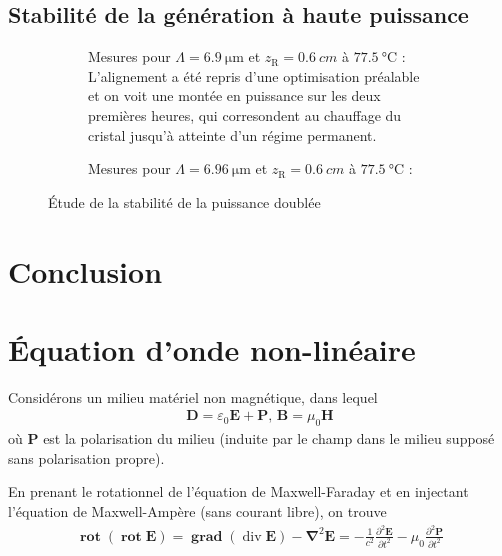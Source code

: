 \documentclass[11pt,a4paper] { article}
\newcommand{\zr}{z_\mathsc{R}}
\DeclareMathOperator{\divg}{div}
\DeclareMathOperator{\rot}{\mathbf{rot}}
\DeclareMathOperator{\grad}{\mathbf{grad}}
\newcommand{\mathsc}[1]{\mathrm{\scriptscriptstyle {#1}}}
\renewcommand{\v}[1]{\boldsymbol{\mathbf{#1}}}
\begin{document}
\subsection{Stabilité de la génération à haute puissance}


\begin{figure}[htpb]  
\centering
\begin{subfigure}[b]{\textwidth}
	\centering
	
	\caption{Mesures pour $\Lambda=\SI{6.9}{\micro\meter}$ et $\zr = \SI{0.6}{cm}$ à $\SI{77.5}{\celsius}$ : \small L'alignement a été repris d'une optimisation préalable et on voit une montée en puissance sur les deux premières heures, qui corresondent au chauffage du cristal jusqu'à atteinte d'un régime permanent.}
	\label{fig:mesc1}
\end{subfigure}
\begin{subfigure}[b]{\textwidth}
	\centering
	
	\caption{Mesures pour $\Lambda=\SI{6.96}{\micro\meter}$ et $\zr = \SI{0.6}{cm}$ à $\SI{77.5}{\celsius}$ : \small}
	\label{fig:mesc2}
\end{subfigure}
\caption{Étude de la stabilité de la puissance doublée}
\end{figure}


\section{Conclusion}




\newpage

\appendix
\section{\'Equation d'onde non-linéaire}  
\label{NL}
Considérons un milieu matériel non magnétique, dans lequel
\begin{align*}
	\v D = \varepsilon_0 \v E + \v P \text{, } \v B = \mu_0 \v H
\end{align*}
où $\v P$ est la polarisation du milieu (induite par le champ dans le milieu supposé sans polarisation propre).

En prenant le rotationnel de l'équation de Maxwell-Faraday et en injectant l'équation de Maxwell-Ampère (sans courant libre), on trouve
\begin{align*}
	\rot (\rot \v E) = \grad (\divg \v E) - \v \nabla^2 \v E = - \frac{1}{c^2} \frac{\partial^2 \v E}{\partial t^2} - \mu_0 \frac{\partial^2 \v P}{\partial t^2} \\
\end{align*}
\end{document}
